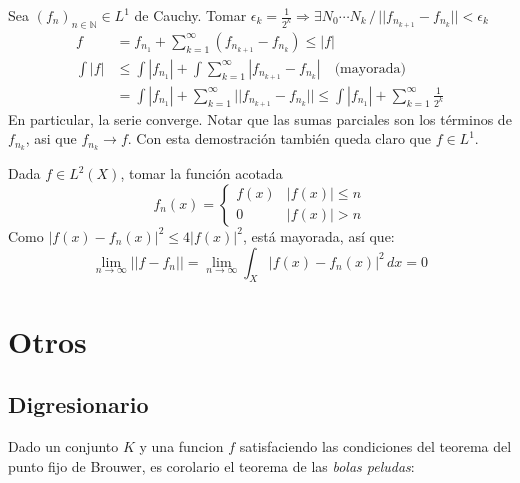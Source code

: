 \documentclass{book}
\begin{document}
\begin{teorema}[$L^1$ es completo]
    Sea $(f_n)_{n\in\mathbb{N}} \in L^1$ de Cauchy. Tomar $\epsilon_k = \frac{1}{2^k} \Rightarrow \exists N_0 \cdots N_k \,/\, || f_{n_{k+1}} - f_{n_k} || < \epsilon_k$
    \begin{align*}
        f &= f_{n_1} + \sum_{k=1}^{\infty}(f_{n_{k+1}} - f_{n_k}) \leq |f|\\
        \int |f| &\leq \int |f_{n_1}| + \int \sum_{k=1}^{\infty}|f_{n_{k+1}} - f_{n_k}| \quad\text{(mayorada)}\\
                 &= \int |f_{n_1}| + \sum_{k=1}^{\infty} ||f_{n_{k+1}} - f_{n_k}|| \leq \int |f_{n_1}| + \sum_{k=1}^{\infty} \frac{1}{2^k}
    \end{align*}
    En particular, la serie converge. Notar que las sumas parciales son los t\'erminos de $f_{n_k}$, asi que $f_{n_k} \rightarrow f$. Con esta demostraci\'on tambi\'en queda claro que $f \in L^1$.
\end{teorema}
\begin{teorema}
\end{teorema}
\begin{teorema}[$B(X)$ es denso en $L^2(X)$]
    Dada $f \in L^2(X)$, tomar la funci\'on acotada
    $$f_n(x) =
    \begin{cases}
        f(x)    & |f(x)| \leq n\\
        0       & |f(x)| > n
    \end{cases}
    $$
    Como $|f(x) - f_n(x)|^2 \leq 4|f(x)|^2$, est\'a mayorada, as\'i que:
    $$
    \lim_{n\to\infty}||f - f_n|| = \lim_{n\to\infty} \int_X |f(x) - f_n(x)|^2\,dx = 0
    $$
\end{teorema}

\chapter{Otros}
\section{Digresionario}
\begin{teorema}
    Dado un conjunto $K$ y una funcion $f$ satisfaciendo las condiciones del teorema del punto fijo de Brouwer,
    es corolario el teorema de las \textit{bolas peludas}:
\end{teorema}
\end{document}
